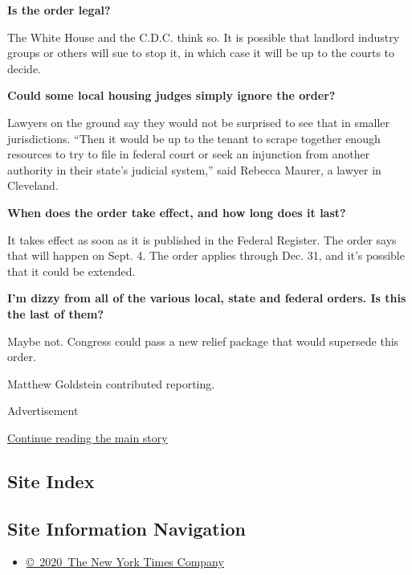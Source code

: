 \textbf{Is the order legal?}

The White House and the C.D.C. think so. It is possible that landlord
industry groups or others will sue to stop it, in which case it will be
up to the courts to decide.

\textbf{Could some local housing judges simply ignore the order?}

Lawyers on the ground say they would not be surprised to see that in
smaller jurisdictions. ``Then it would be up to the tenant to scrape
together enough resources to try to file in federal court or seek an
injunction from another authority in their state's judicial system,''
said Rebecca Maurer, a lawyer in Cleveland.

\textbf{When does the order take effect, and how long does it last?}

It takes effect as soon as it is published in the Federal Register. The
order says that will happen on Sept. 4. The order applies through Dec.
31, and it's possible that it could be extended.

\textbf{I'm dizzy from all of the various local, state and federal
orders. Is this the last of them?}

Maybe not. Congress could pass a new relief package that would supersede
this order.

Matthew Goldstein contributed reporting.

Advertisement

\protect\hyperlink{after-bottom}{Continue reading the main story}

\hypertarget{site-index}{%
\subsection{Site Index}\label{site-index}}

\hypertarget{site-information-navigation}{%
\subsection{Site Information
Navigation}\label{site-information-navigation}}

\begin{itemize}
\tightlist
\item
  \href{https://help.nytimes3xbfgragh.onion/hc/en-us/articles/115014792127-Copyright-notice}{©~2020~The
  New York Times Company}
\end{itemize}

